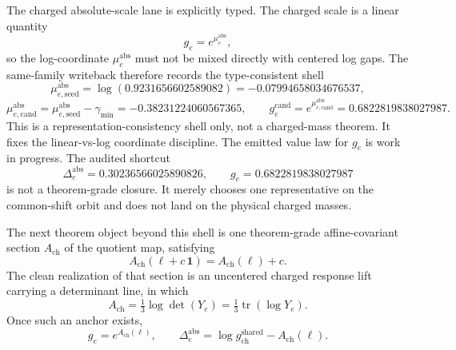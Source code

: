 \documentclass[11pt]{article}
\begin{document}
The charged absolute-scale
lane is explicitly typed. The charged scale is a linear quantity
\[
g_e = e^{\mu_e^{\mathrm{abs}}},
\]
so the log-coordinate \(\mu_e^{\mathrm{abs}}\) must not be mixed directly with centered log gaps.
The same-family writeback therefore records the type-consistent shell
\[
\mu_{e,\mathrm{seed}}^{\mathrm{abs}} = \log(0.9231656602589082) = -0.07994658034676537,
\]
\[
\mu_{e,\mathrm{cand}}^{\mathrm{abs}}
=
\mu_{e,\mathrm{seed}}^{\mathrm{abs}}-\gamma_{\min}
=
-0.38231224060567365,
\qquad
g_e^{\mathrm{cand}} = e^{\mu_{e,\mathrm{cand}}^{\mathrm{abs}}}=0.6822819838027987.
\]
This is a representation-consistency shell only, not a charged-mass theorem. It fixes the
linear-vs-log coordinate discipline. The emitted value law for \(g_e\) is work in progress.
The audited shortcut
\[
\Delta_e^{\mathrm{abs}}=0.30236566025890826,
\qquad
g_e=0.6822819838027987
\]
is not a theorem-grade closure. It merely chooses one representative on the common-shift orbit and
does not land on the physical charged masses.

The next theorem object beyond this shell is one
theorem-grade affine-covariant section \(A_{\mathrm{ch}}\) of the quotient map, satisfying
\[
A_{\mathrm{ch}}(\ell + c\,\mathbf 1)=A_{\mathrm{ch}}(\ell)+c.
\]
The clean realization of that section is an uncentered charged response lift carrying a
determinant line, in which
\[
A_{\mathrm{ch}}=\tfrac13 \log \det(Y_e)=\tfrac13 \operatorname{tr}(\log Y_e).
\]
Once such an anchor exists,
\[
g_e = e^{A_{\mathrm{ch}}(\ell)},
\qquad
\Delta_e^{\mathrm{abs}} = \log g_{\mathrm{ch}}^{\mathrm{shared}} - A_{\mathrm{ch}}(\ell).
\]
\end{document}
